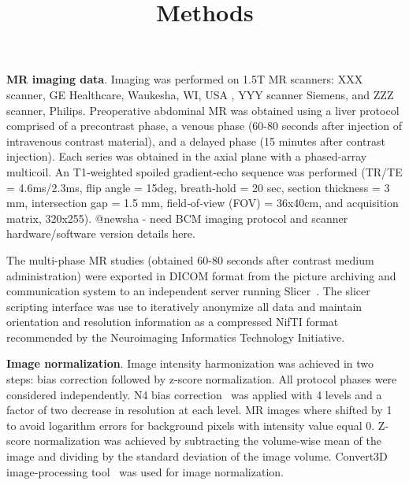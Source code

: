 \documentclass{article}         %
\title{Methods}
\author{}
\theoremstyle{definition}
\theoremstyle{remark}
\begin{document}
\maketitle

\textbf{MR imaging data}.  Imaging was performed on 1.5T MR scanners:
XXX scanner, GE Healthcare, Waukesha, WI, USA , YYY scanner  Siemens, and ZZZ scanner, Philips.
Preoperative abdominal MR was obtained using a  liver protocol comprised of a
precontrast phase, a venous phase (60-80 seconds after injection of intravenous contrast
material), and a delayed phase (15 minutes after contrast injection).
Each series was obtained in the axial plane with a
phased‐array multicoil.
An T1‐weighted spoiled gradient‐echo sequence 
was performed (TR/TE = 4.6ms/2.3ms, flip angle = 15deg, breath‐hold = 20 sec,
section thickness = 3 mm, intersection gap = 1.5 mm, field‐of‐view (FOV) = 36x40cm, and
acquisition matrix, 320x255).
{\color{red} @newsha - need BCM imaging protocol and scanner hardware/software version details here.}

The multi-phase MR studies (obtained 60-80 seconds after contrast medium
administration) were exported in DICOM format from the picture archiving and communication
system to an independent server running Slicer~\cite{kikinis20143d}.
The slicer scripting interface was use to iteratively anonymize all data and maintain
orientation and resolution information as a compressed
NifTI format recommended by the Neuroimaging Informatics Technology Initiative.



\textbf{Image normalization}.
Image intensity harmonization was achieved in two steps: bias correction followed by z-score normalization. 
All protocol phases were considered independently.
N4 bias correction~\cite{tustison2010n4itk} was applied  with  4 levels and a factor of two decrease in resolution
at each level. 
MR images where shifted by 1 to avoid logarithm errors for background pixels with intensity value equal 0.
Z-score normalization was achieved by subtracting the volume-wise mean of the image and dividing by the 
standard deviation of the image volume.
Convert3D image-processing tool~\cite{yushkevich2006user} was used for image normalization.
\end{document}

